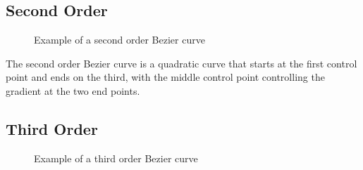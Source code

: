 \documentclass[a5paper,12pt]{book}
\begin{document}
\subsection{Second Order}
\begin{figure}[h]
    \centering
    
    \caption{Example of a second order Bezier curve} \label{fig:example-second}
\end{figure}
The second order Bezier curve is a quadratic curve that starts at the first control point and ends on the third, with the middle control point controlling the gradient at the two end points.
\subsection{Third Order}
\begin{figure}[h]
    \centering
    
    \caption{Example of a third order Bezier curve} \label{fig:example-third}
\end{figure}
\clearpage
{}
\printindex
\end{document}
